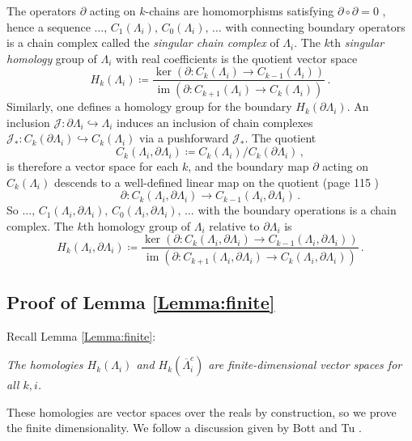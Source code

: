 \documentclass[11pt]{article}
\theoremstyle{plain}
\theoremstyle{definition}
\theoremstyle{remark}
\newcommand{\ST}{\Lambda}
\begin{document}
The operators \(\partial\) acting on \(k\)-chains are homomorphisms satisfying \(\partial\circ\partial=0\) \cite{lee}, hence a sequence \(\dots , \, C_1(\ST_i) \mathbin{,} \, C_0(\ST_i) \mathbin{,} \, \dots \) with connecting boundary operators is a chain complex called the \emph{singular chain complex} of \(\ST_i\). The \(k\)th \emph{singular homology} group of \(\ST_i\) with real coefficients is the quotient vector space 
\[
  H_k(\ST_i)\coloneqq  \frac{\ker(\partial: C_k(\ST_i)\longrightarrow C_{k-1}(\ST_i)) }{  \operatorname{im}(\partial: C_{k+1}(\ST_i)\longrightarrow C_{k}(\ST_i))} \, .
\]
Similarly, one defines a homology group for the boundary \(H_k(\partial \ST_i)\). An inclusion \(\mathcal{J}:\partial \ST_i \hookrightarrow \ST_i\) induces an inclusion of chain complexes \( \mathcal{J}_* : C_k(\partial \ST_i )\hookrightarrow C_k(\ST_i)\) via a pushforward \(\mathcal{J}_*\). The quotient
\[
  C_k(\ST_i,\partial \ST_i )\coloneqq C_k(\ST_i)/C_k(\partial \ST_i ) \, ,
\]
is therefore a vector space for each \(k\), and the boundary map \(\partial\) acting on \(C_k(\ST_i)\) descends to a well-defined linear map on the quotient (page 115 \cite{hatcher2005algebraic})
\[
   \partial: C_k(\ST_i,\partial \ST_i )\longrightarrow C_{k-1}(\ST_i,\partial \ST_i ) \, .
\]
So \(\dots , \, C_1(\ST_i, \partial \ST_i ) , \, C_0(\ST_i, \partial \ST_i ), \, \dots \) with the boundary operations is a chain complex. The \(k\)th homology group of \(\ST_i\) relative to \(\partial \ST_i\) is 
\[
  H_k(\ST_i,\partial \ST_i)\coloneqq  \frac{\ker( \partial: C_k(\ST_i, \partial \ST_i )\longrightarrow C_{k-1}(\ST_i, \partial \ST_i)) }{  \operatorname{im}(  \partial: C_{k+1}(\ST_i, \partial \ST_i)\longrightarrow C_{k}(\ST_i, \partial \ST_i))} \, .
\]




\subsection{Proof of Lemma \ref{Lemma:finite}}\label{sub:finite}


Recall Lemma \ref{Lemma:finite}:
\begin{center}
    \textit{The homologies \(H_k (\ST_i)\) and \(H_k (\overline{\ST}_i^c)\) are finite-dimensional vector spaces for all \(k,i\).}
\end{center}

 
These homologies are vector spaces over the reals by construction, so we prove the finite dimensionality. We follow a discussion given by Bott and Tu \cite{bott2013differential}.
\end{document}
